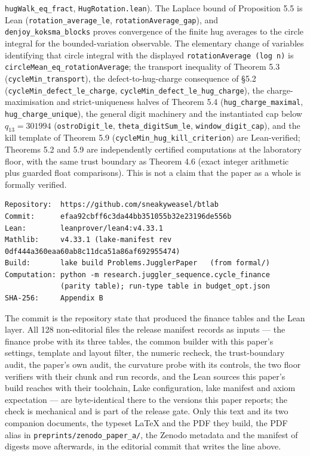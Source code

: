\documentclass[12pt]{article}
\begin{document}
\texttt{\nolinkurl{hugWalk_eq_fract}},
\texttt{\nolinkurl{HugRotation.lean}}). The Laplace bound of Proposition
5.5 is Lean (\texttt{\nolinkurl{rotation_average_le}},
\texttt{\nolinkurl{rotationAverage_gap}}), and
\texttt{\nolinkurl{denjoy_koksma_blocks}} proves convergence of the
finite hug averages to the circle integral for the bounded-variation
observable. The elementary change of variables identifying that circle
integral with the displayed
\texttt{rotationAverage\ (log\ n\textquotesingle{})} is
\texttt{\nolinkurl{circleMean_eq_rotationAverage}}; the transport
inequality of Theorem 5.3 (\texttt{\nolinkurl{cycleMin_transport}}), the
defect-to-hug-charge consequence of §5.2
(\texttt{\nolinkurl{cycleMin_defect_le_charge}},
\texttt{\nolinkurl{cycleMin_defect_le_hug_charge}}), the
charge-maximisation and strict-uniqueness halves of Theorem 5.4
(\texttt{\nolinkurl{hug_charge_maximal}},
\texttt{\nolinkurl{hug_charge_unique}}), the general digit machinery and
the instantiated cap below \(q_{13}=301994\)
(\texttt{\nolinkurl{ostroDigit_le}},
\texttt{\nolinkurl{theta_digitSum_le}},
\texttt{\nolinkurl{window_digit_cap}}), and the kill template of Theorem
5.9 (\texttt{\nolinkurl{cycleMin_hug_kill_criterion}}) are
Lean-verified; Theorems 5.2 and 5.9 are independently certified
computations at the laboratory floor, with the same trust boundary as
Theorem 4.6 (exact integer arithmetic plus guarded float comparisons).
This is not a claim that the paper as a whole is formally verified.

\begin{verbatim}
Repository:  https://github.com/sneakyweasel/btlab
Commit:      efaa92cbff6c3da44bb351055b32e23196de556b
Lean:        leanprover/lean4:v4.33.1
Mathlib:     v4.33.1 (lake-manifest rev 0df444a360eaa60ab8c11dca51a86af692955474)
Build:       lake build Problems.JugglerPaper   (from formal/)
Computation: python -m research.juggler_sequence.cycle_finance
             (parity table); run-type table in budget_opt.json
SHA-256:     Appendix B
\end{verbatim}

The commit is the repository state that produced the finance tables and
the Lean layer. All 128 non-editorial files the release manifest records
as inputs --- the finance probe with its three tables, the common
builder with this paper's settings, template and layout filter, the
numeric recheck, the trust-boundary audit, the paper's own audit, the
curvature probe with its controls, the two floor verifiers with their
chunk and run records, and the Lean sources this paper's build reaches
with their toolchain, Lake configuration, lake manifest and axiom
expectation --- are byte-identical there to the versions this paper
reports; the check is mechanical and is part of the release gate. Only
this text and its two companion documents, the typeset LaTeX and the PDF
they build, the PDF alias in
\texttt{\nolinkurl{preprints/zenodo_paper_a/}}, the Zenodo metadata and
the manifest of digests move afterwards, in the editorial commit that
writes the line above.
\end{document}
